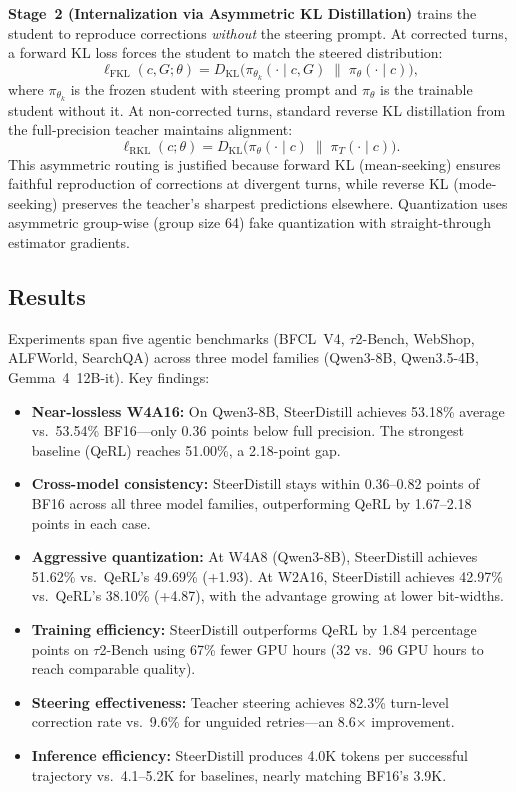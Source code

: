 \documentclass[11pt,a4paper]{article}
\begin{document}
\textbf{Stage~2 (Internalization via Asymmetric KL Distillation)} trains the student to reproduce corrections \emph{without} the steering prompt. At corrected turns, a forward KL loss forces the student to match the steered distribution:
\[
  \ell_{\mathrm{FKL}}(c, G; \theta) = D_{\mathrm{KL}}\bigl(\pi_{\theta_k}(\cdot \mid c, G) \;\|\; \pi_\theta(\cdot \mid c)\bigr),
\]
where $\pi_{\theta_k}$ is the frozen student with steering prompt and $\pi_\theta$ is the trainable student without it. At non-corrected turns, standard reverse KL distillation from the full-precision teacher maintains alignment:
\[
  \ell_{\mathrm{RKL}}(c; \theta) = D_{\mathrm{KL}}\bigl(\pi_\theta(\cdot \mid c) \;\|\; \pi_T(\cdot \mid c)\bigr).
\]
This asymmetric routing is justified because forward KL (mean-seeking) ensures faithful reproduction of corrections at divergent turns, while reverse KL (mode-seeking) preserves the teacher's sharpest predictions elsewhere. Quantization uses asymmetric group-wise (group size 64) fake quantization with straight-through estimator gradients.

\subsection{Results}
Experiments span five agentic benchmarks (BFCL~V4, $\tau$2-Bench, WebShop, ALFWorld, SearchQA) across three model families (Qwen3-8B, Qwen3.5-4B, Gemma~4~12B-it). Key findings:

\begin{itemize}
  \item \textbf{Near-lossless W4A16:} On Qwen3-8B, SteerDistill achieves 53.18\% average vs.\ 53.54\% BF16---only 0.36 points below full precision. The strongest baseline (QeRL) reaches 51.00\%, a 2.18-point gap.
  \item \textbf{Cross-model consistency:} SteerDistill stays within 0.36--0.82 points of BF16 across all three model families, outperforming QeRL by 1.67--2.18 points in each case.
  \item \textbf{Aggressive quantization:} At W4A8 (Qwen3-8B), SteerDistill achieves 51.62\% vs.\ QeRL's 49.69\% (+1.93). At W2A16, SteerDistill achieves 42.97\% vs.\ QeRL's 38.10\% (+4.87), with the advantage growing at lower bit-widths.
  \item \textbf{Training efficiency:} SteerDistill outperforms QeRL by 1.84 percentage points on $\tau$2-Bench using 67\% fewer GPU hours (32 vs.\ 96 GPU hours to reach comparable quality).
  \item \textbf{Steering effectiveness:} Teacher steering achieves 82.3\% turn-level correction rate vs.\ 9.6\% for unguided retries---an 8.6$\times$ improvement.
  \item \textbf{Inference efficiency:} SteerDistill produces 4.0K tokens per successful trajectory vs.\ 4.1--5.2K for baselines, nearly matching BF16's 3.9K.
\end{itemize}
\end{document}
